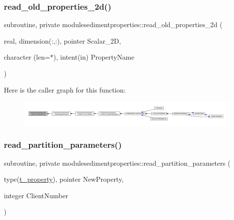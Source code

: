 \subsubsection{\texorpdfstring{read\+\_\+old\+\_\+properties\+\_\+2d()}{read\_old\_properties\_2d()}}
{\footnotesize\ttfamily subroutine, private modulesedimentproperties\+::read\+\_\+old\+\_\+properties\+\_\+2d (\begin{DoxyParamCaption}\item[{real, dimension(\+:,\+:), pointer}]{Scalar\+\_\+2D,  }\item[{character (len=$\ast$), intent(in)}]{Property\+Name }\end{DoxyParamCaption})\hspace{0.3cm}{\ttfamily [private]}}

Here is the caller graph for this function\+:\nopagebreak
\begin{figure}[H]
\begin{center}
\leavevmode
\includegraphics[width=350pt]{namespacemodulesedimentproperties_a4e8f3da0b8583fb335570e3c3f8a4bb0_icgraph}
\end{center}
\end{figure}
\mbox{\label{namespacemodulesedimentproperties_afa4c90b28af961558ea18ba6ed05123b}} 
\subsubsection{\texorpdfstring{read\+\_\+partition\+\_\+parameters()}{read\_partition\_parameters()}}
{\footnotesize\ttfamily subroutine, private modulesedimentproperties\+::read\+\_\+partition\+\_\+parameters (\begin{DoxyParamCaption}\item[{type(\mbox{\hyperlink{structmodulesedimentproperties_1_1t__property}{t\+\_\+property}}), pointer}]{New\+Property,  }\item[{integer}]{Client\+Number }\end{DoxyParamCaption})\hspace{0.3cm}{\ttfamily [private]}}

